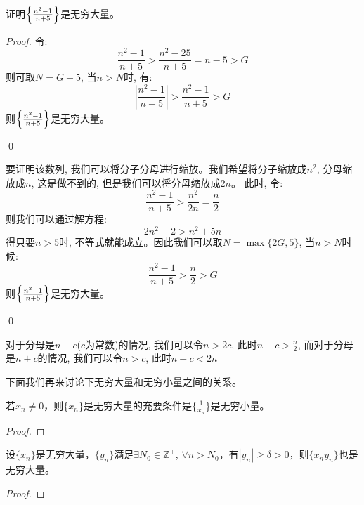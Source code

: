 \begin{example}
    证明$\left\{ \frac{n^2-1}{n+5}\right\}$是无穷大量。 
\end{example}
\begin{proof}
    令:
    \begin{equation*}
        \frac{n^2-1}{n+5} > \frac{n^2-25}{n+5} = n-5 > G 
    \end{equation*}
    则可取$N = G + 5$, 当$n > N$时, 有:
    \begin{equation*}
        \left| \frac{n^2-1}{n+5} \right| > \frac{n^2-1}{n+5} > G
    \end{equation*}
    则$\left\{ \frac{n^2-1}{n+5}\right\}$是无穷大量。

    \qed

    要证明该数列, 我们可以将分子分母进行缩放。我们希望将分子缩放成$n^2$, 分母缩放成$n$, 这是做不到的, 但是我们可以将分母缩放成$2n$。
    此时, 令:
    \begin{equation*}
        \frac{n^2-1}{n+5} > \frac{n^2}{2n} = \frac{n}{2}
    \end{equation*}
    则我们可以通过解方程:
    \begin{equation*}
        2n^2-2 > n^2 + 5n
    \end{equation*}
    得只要$n > 5$时, 不等式就能成立。因此我们可以取$N = \max\{2G, 5\}$, 当$n > N$时候:
    \begin{equation*}
        \frac{n^2-1}{n+5} > \frac{n}{2} > G
    \end{equation*}
    则$\left\{ \frac{n^2-1}{n+5}\right\}$是无穷大量。

    \qed

\end{proof}
\begin{remark}
    对于分母是$n-c$($c$为常数)的情况, 我们可以令$n > 2c$, 此时$n - c > \frac{n}{2}$, 而对于分母是$n+c$的情况, 我们可以令$n > c$, 此时$n + c < 2n$
\end{remark}

下面我们再来讨论下无穷大量和无穷小量之间的关系。
\begin{lemma}\label{lemma:inverse}
    若$x_n \neq 0$，则$\{ x_n \}$是无穷大量的充要条件是$\{ \frac{1}{x_n} \}$是无穷小量。    
\end{lemma}
\begin{proof}

\end{proof}

\begin{lemma}
    设$\{ x_n \}$是无穷大量，$\{ y_n \}$满足$\exists N_0 \in \mathbb{Z}^+$, $\forall n > N_0$，有$| y_n | \ge \delta > 0$，则$\{ x_n y_n\}$也是无穷大量。
\end{lemma}
\begin{proof}
\end{proof}

